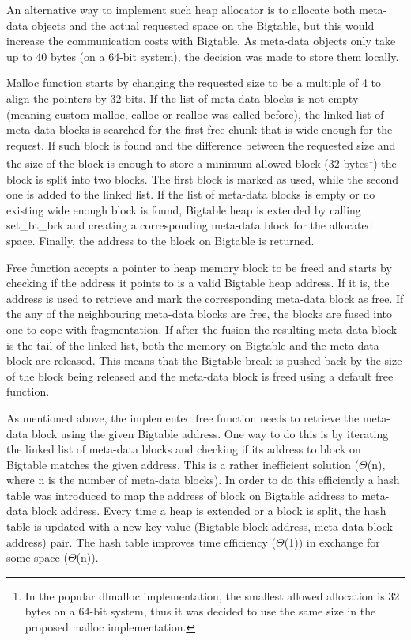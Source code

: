 \documentclass[bsc,frontabs,twoside,singlespacing,parskip,deptreport]{infthesis}     %
\begin{document}
An alternative way to implement such heap allocator is to allocate both meta-data objects and the actual requested space on the Bigtable, but this would increase the communication costs with Bigtable. As meta-data objects only take up to 40 bytes (on a 64-bit system), the decision was made to store them locally.

Malloc function starts by changing the requested size to be a multiple of 4 to align the pointers by 32 bits. If the list of meta-data blocks is not empty (meaning custom malloc, calloc or realloc was called before), the linked list of meta-data blocks is searched for the first free chunk that is wide enough for the request. If such block is found and the difference between the requested size and the size of the block is enough to store a minimum allowed block (32 bytes\footnote{In the popular dlmalloc \citep{leadlmalloc} implementation, the smallest allowed allocation is 32 bytes on a 64-bit system, thus it was decided to use the same size in the proposed malloc implementation.}) the block is split into two blocks. The first block is marked as used, while the second one is added to the linked list. If the list of meta-data blocks is empty or no existing wide enough block is found, Bigtable heap is extended by calling set\_bt\_brk and creating a corresponding meta-data block for the allocated space. Finally, the address to the block on Bigtable is returned.

Free function accepts a pointer to heap memory block to be freed and starts by checking if the address it points to is a valid Bigtable heap address. If it is, the address is used to retrieve and mark the corresponding meta-data block as free. If the any of the neighbouring meta-data blocks are free, the blocks are fused into one to cope with fragmentation. If after the fusion the resulting meta-data block is the tail of the linked-list, both the memory on Bigtable and the meta-data block are released. This means that the Bigtable break is pushed back by the size of the block being released and the meta-data block is freed using a default free function.

As mentioned above, the implemented free function needs to retrieve the meta-data block using the given Bigtable address. One way to do this is by iterating the linked list of meta-data blocks and checking if its address to block on Bigtable matches the given address. This is a rather inefficient solution (\(\Theta\)(n), where n is the number of meta-data blocks). In order to do this efficiently a hash table was introduced to map the address of block on Bigtable address to meta-data block address. Every time a heap is extended or a block is split, the hash table is updated with a new key-value (Bigtable block address, meta-data block address) pair. The hash table improves time efficiency (\(\Theta\)(1)) in exchange for some space (\(\Theta\)(n)).
\end{document}

